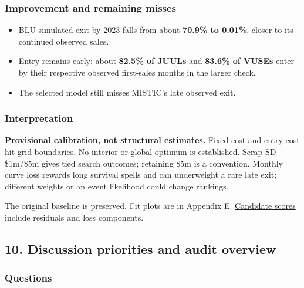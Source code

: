 \documentclass[11pt,]{article}
\providecommand{\tightlist}{%
  \setlength{\itemsep}{0pt}\setlength{\parskip}{0pt}}
\begin{document}
\subsubsection{Improvement and remaining
misses}\label{improvement-and-remaining-misses}

\begin{itemize}
\tightlist
\item
  BLU simulated exit by 2023 falls from about \textbf{70.9\% to 0.01\%},
  closer to its continued observed sales.
\item
  Entry remains early: about \textbf{82.5\% of JUULs} and \textbf{83.6\%
  of VUSEs} enter by their respective observed first-sales months in the
  larger check.
\item
  The selected model still misses MISTIC's late observed exit.
\end{itemize}

\subsubsection{Interpretation}\label{interpretation}

\textbf{Provisional calibration, not structural estimates.} Fixed cost
and entry cost hit grid boundaries. No interior or global optimum is
established. Scrap SD \$1m/\$5m gives tied search outcomes; retaining
\$5m is a convention. Monthly curve loss rewards long survival spells
and can underweight a rare late exit; different weights or an event
likelihood could change rankings.

The original baseline is preserved. Fit plots are in Appendix E.
\href{../../output/dynamic_entry_exit/coordinate_search_2026-11-06/candidate_scores.csv}{Candidate
scores} include residuals and loss components.

\clearpage

\subsection{10. Discussion priorities and audit
overview}\label{discussion-priorities-and-audit-overview}

\subsubsection{Questions}\label{questions}
\end{document}
